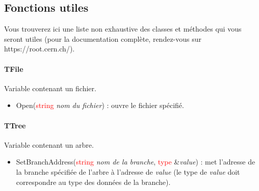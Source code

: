 \documentclass[a4paper]{report}
\begin{document}
\subsection{Fonctions utiles}
Vous trouverez ici une liste non exhaustive des classes et m\'{e}thodes qui vous seront utiles (pour la documentation compl\`{e}te, rendez-vous sur https://root.cern.ch/). \\

\paragraph{TFile}
Variable contenant un fichier.
 \begin{itemize}
  \item Open(\textcolor{red}{string} \textit{nom du fichier}) : ouvre le fichier sp\'{e}cifi\'{e}.
 \end{itemize} 

 \paragraph{TTree}
 Variable contenant un arbre.
  \begin{itemize}
   \item SetBranchAddress(\textcolor{red}{string} \textit{nom de la branche}, \textcolor{red}{type} \&\textit{value}) : met l'adresse de la branche sp\'{e}cifi\'{e}e de l'arbre \`{a} l'adresse de \textit{value} (le type de \textit{value} doit correspondre au type des donn\'{e}es de la branche). 
  \end{itemize}
\end{document}
